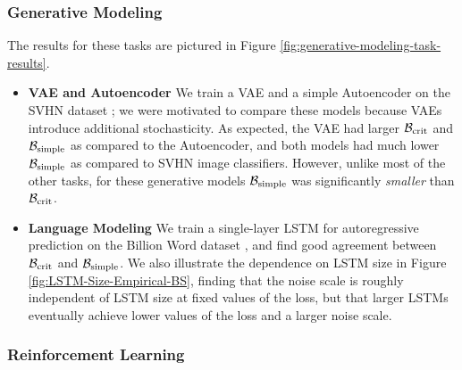 \documentclass[english]{article}
\newcommand{\CB}{{\cal B}}
\begin{document}
\subsubsection*{Generative Modeling}

The results for  these tasks are pictured in Figure \ref{fig:generative-modeling-task-results}.
\begin{itemize}
\item {\bf VAE and Autoencoder}   We train a VAE  \cite{1312.6114} and a simple Autoencoder on the SVHN dataset \cite{Netzer2011ReadingDI}; we were motivated to compare these models because VAEs introduce additional stochasticity.  As expected, the VAE had larger $\CB_{\rm crit}$ and $\CB_{\rm simple}$ as compared to the Autoencoder, and both models had much lower $\CB_{\rm simple}$ as compared to SVHN image classifiers.  However, unlike most of the other tasks, for these generative models  $\CB_{\rm simple}$ was significantly \emph{smaller} than $\CB_{\rm crit}$.
\item {\bf Language Modeling}   We train a single-layer LSTM for autoregressive prediction on the Billion Word dataset \cite{1312.3005}, and find good agreement between $\CB_{\rm crit}$ and $\CB_{\rm simple}$.   We also illustrate the dependence on LSTM size in Figure \ref{fig:LSTM-Size-Empirical-BS}, finding that the noise scale is roughly independent of LSTM size at fixed values of the loss, but that larger LSTMs eventually achieve lower values of the loss and a larger noise scale.
\end{itemize}


\subsubsection*{Reinforcement Learning}
\end{document}
